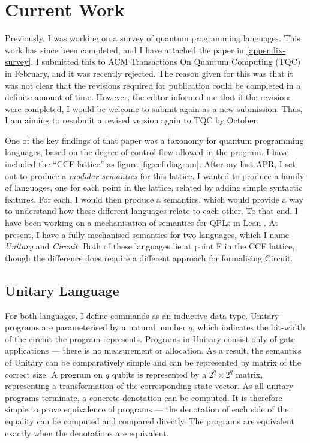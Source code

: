 \section{Current Work} \label{work}

Previously, I was working on a survey of quantum programming languages.
% 
This work has since been completed, and I have attached the paper in \cref{appendix-survey}.
% 
I submitted this to ACM Transactions On Quantum Computing (TQC) in February, and it was recently rejected.
% 
The reason given for this was that it was not clear that the revisions required for publication could be completed in a definite 
amount of time.
% 
However, the editor informed me that if the revisions were completed, I would be welcome to submit again as a new submission.
% 
Thus, I am aiming to resubmit a revised version again to TQC by October.




One of the key findings of that paper was a taxonomy for quantum programming languages, based on the 
degree of control flow allowed in the program.
% 
I have included the ``CCF lattice'' as figure \ref{fig:ccf-diagram}.
% 
After my last APR, I set out to produce a \emph{modular semantics} for this lattice.
% 
I wanted to produce a family of languages, one for each point in the lattice, related by adding 
simple syntactic features.
% 
For each, I would then produce a semantics, which would provide a way to understand how these different languages relate to
each other.
% 
To that end, I have been working on a mechanisation of semantics for QPLs in Lean \cite{De_Moura_2021_lean4}.
% 
At present, I have a fully mechanised semantics for two languages, which I name \emph{Unitary} and \emph{Circuit}. 
% 
Both of these languages lie at point F in the CCF lattice, though the difference does require a different approach for formalising Circuit.


\subsection{Unitary Language}
For both languages, I define commands as an inductive data type.
%
Unitary programs are parameterised by a natural number $q$, which indicates the bit-width
of the circuit the program represents. 
% 
Programs in Unitary consist only of gate applications --- there is no measurement or allocation. 
% 
As a result, the semantics of Unitary can be comparatively simple and can be represented by matrix of the correct size.
% 
A program on $q$ qubits is represented by a $2^q \times 2^q$ matrix, representing a transformation of the corresponding state vector.
% 
As all unitary programs terminate, a concrete denotation can be computed.
% 
It is therefore simple to prove equivalence of programs --- the denotation of each side of the equality can be computed 
and compared directly.
% 
The programs are equivalent exactly when the denotations are equivalent.


